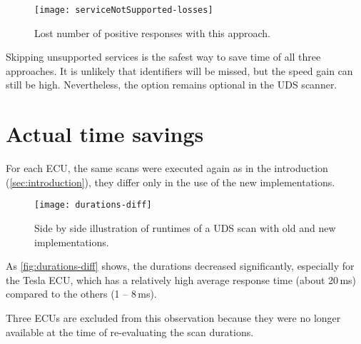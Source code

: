 \begin{figure}[htb]
    \centering
    \texttt{[image: serviceNotSupported-losses]}
    \caption{Lost number of positive responses with this approach.}
    \label{fig:serviceNotSupported-losses}
\end{figure}

Skipping unsupported services is the safest way to save time of all three approaches. 
It is unlikely that identifiers will be missed, but the speed gain can still be high. 
Nevertheless, the option remains optional in the UDS scanner.

\section{Actual time savings}


For each ECU, the same scans were executed again as in the introduction (\autoref{sec:introduction}), they differ only in the use of the new implementations.

\begin{figure}[htb]
    \centering
    \texttt{[image: durations-diff]}
    \caption{Side by side illustration of runtimes of a UDS scan with old and new implementations.}
    \label{fig:durations-diff}
\end{figure}


As \autoref{fig:durations-diff} shows, the durations decreased significantly, especially for the Tesla ECU, which has a relatively high average response time (about 20\,ms) compared to the others (1 – 8\,ms).

Three ECUs are excluded from this observation because they were no longer available at the time of re-evaluating the scan durations.
